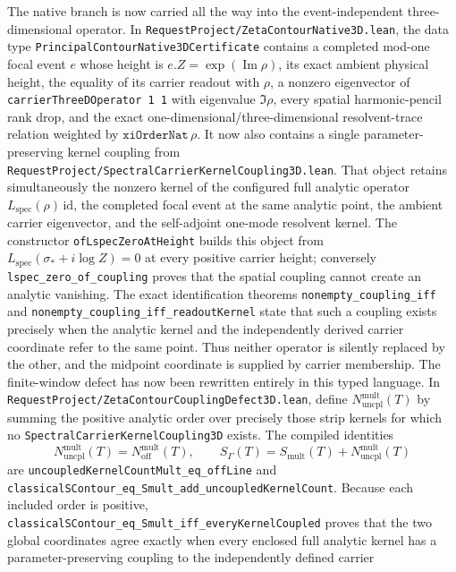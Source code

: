 \documentclass[11pt]{article}
\theoremstyle{definition}
\begin{document}
The native branch is now carried all the way into the event-independent
three-dimensional operator.  In
\texttt{RequestProject/ZetaContourNative3D.lean}, the data type
\texttt{PrincipalContourNative3DCertificate} contains a completed mod-one
focal event \(e\) whose height is \(e.Z=\exp(\operatorname{Im}\rho)\),
its exact ambient physical height,
the equality of its carrier readout with \(\rho\), a nonzero eigenvector of
\texttt{carrierThreeDOperator 1 1} with eigenvalue \(\Im\rho\), every spatial
harmonic-pencil rank drop, and the exact one-dimensional/three-dimensional
resolvent-trace relation weighted by \(\texttt{xiOrderNat}\,\rho\).  It now also
contains a single parameter-preserving kernel coupling from
\texttt{RequestProject/SpectralCarrierKernelCoupling3D.lean}.  That object retains
simultaneously the nonzero kernel of the configured full analytic operator
\(L_{\mathrm{spec}}(\rho)\,\mathrm{id}\), the completed focal event at the same
analytic point, the ambient carrier eigenvector, and the self-adjoint one-mode
resolvent kernel.  The constructor \texttt{ofLspecZeroAtHeight} builds this object
from \(L_{\mathrm{spec}}(\sigma_*+i\log Z)=0\) at every positive carrier height;
conversely \texttt{lspec\_zero\_of\_coupling} proves that the spatial coupling
cannot create an analytic vanishing.  The exact identification theorems
\texttt{nonempty\_coupling\_iff} and
\texttt{nonempty\_coupling\_iff\_readoutKernel} state that such a coupling exists
precisely when the analytic kernel and the independently derived carrier
coordinate refer to the same point.  Thus neither operator is silently replaced
by the other, and the midpoint coordinate is supplied by carrier membership.
The finite-window defect has now been rewritten entirely in this typed language.
In \texttt{RequestProject/ZetaContourCouplingDefect3D.lean}, define
\(N_{\mathrm{uncpl}}^{\mathrm{mult}}(T)\) by summing the positive analytic order
over precisely those strip kernels for which no
\texttt{SpectralCarrierKernelCoupling3D} exists.  The compiled identities
\[
 N_{\mathrm{uncpl}}^{\mathrm{mult}}(T)
   =N_{\mathrm{off}}^{\mathrm{mult}}(T),\qquad
 S_\Gamma(T)=S_{\mathrm{mult}}(T)
   +N_{\mathrm{uncpl}}^{\mathrm{mult}}(T)
\]
are \texttt{uncoupledKernelCountMult\_eq\_offLine} and
\texttt{classicalSContour\_eq\_Smult\_add\_uncoupledKernelCount}.
Because each included order is positive,
\texttt{classicalSContour\_eq\_Smult\_iff\_everyKernelCoupled} proves that the
two global coordinates agree exactly when every enclosed full analytic kernel
has a parameter-preserving coupling to the independently defined carrier
\end{document}
